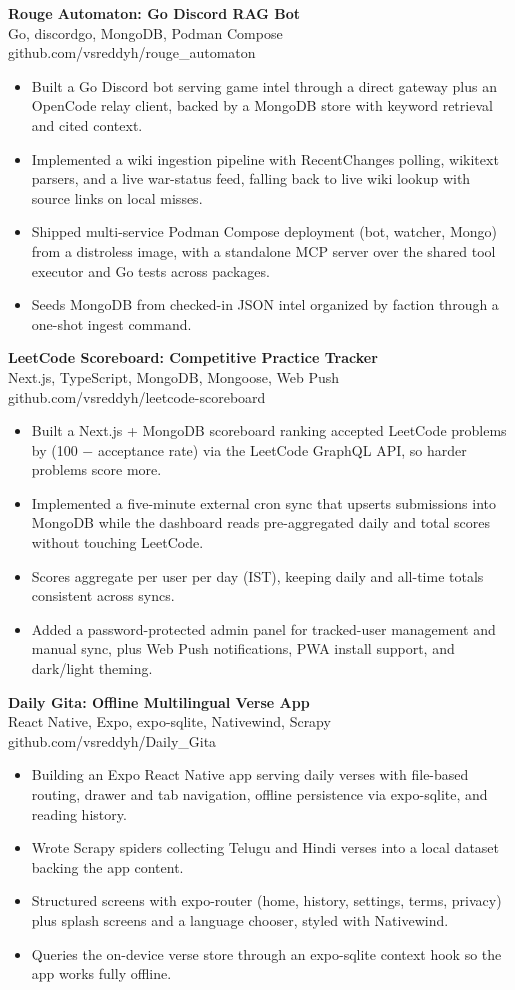 \documentclass[a4paper,11pt]{article}
\newcommand{\resumeItem}[1]{\item \small{#1}}
\newcommand{\resumeSubheading}[4]{%
  \textbf{#1} \hfill \textbf{#2} \\
{#3} \hfill {#4}
}
\newcommand{\resumeSubHeadingListStart}{\begin{itemize}}
\newcommand{\resumeSubHeadingListEnd}{\end{itemize}}
\begin{document}
\resumeSubheading
{Rouge Automaton: Go Discord RAG Bot}{}{Go, discordgo, MongoDB, Podman Compose}{github.com/vsreddyh/rouge\_automaton}
\resumeSubHeadingListStart
\resumeItem{Built a Go Discord bot serving game intel through a direct gateway plus an OpenCode relay client, backed by a MongoDB store with keyword retrieval and cited context.}
\resumeItem{Implemented a wiki ingestion pipeline with RecentChanges polling, wikitext parsers, and a live war-status feed, falling back to live wiki lookup with source links on local misses.}
\resumeItem{Shipped multi-service Podman Compose deployment (bot, watcher, Mongo) from a distroless image, with a standalone MCP server over the shared tool executor and Go tests across packages.}
\resumeItem{Seeds MongoDB from checked-in JSON intel organized by faction through a one-shot ingest command.}
\resumeSubHeadingListEnd

\resumeSubheading
{LeetCode Scoreboard: Competitive Practice Tracker}{}{Next.js, TypeScript, MongoDB, Mongoose, Web Push}{github.com/vsreddyh/leetcode-scoreboard}
\resumeSubHeadingListStart
\resumeItem{Built a Next.js + MongoDB scoreboard ranking accepted LeetCode problems by (100 $-$ acceptance rate) via the LeetCode GraphQL API, so harder problems score more.}
\resumeItem{Implemented a five-minute external cron sync that upserts submissions into MongoDB while the dashboard reads pre-aggregated daily and total scores without touching LeetCode.}
\resumeItem{Scores aggregate per user per day (IST), keeping daily and all-time totals consistent across syncs.}
\resumeItem{Added a password-protected admin panel for tracked-user management and manual sync, plus Web Push notifications, PWA install support, and dark/light theming.}
\resumeSubHeadingListEnd

\resumeSubheading
{Daily Gita: Offline Multilingual Verse App}{}{React Native, Expo, expo-sqlite, Nativewind, Scrapy}{github.com/vsreddyh/Daily\_Gita}
\resumeSubHeadingListStart
\resumeItem{Building an Expo React Native app serving daily verses with file-based routing, drawer and tab navigation, offline persistence via expo-sqlite, and reading history.}
\resumeItem{Wrote Scrapy spiders collecting Telugu and Hindi verses into a local dataset backing the app content.}
\resumeItem{Structured screens with expo-router (home, history, settings, terms, privacy) plus splash screens and a language chooser, styled with Nativewind.}
\resumeItem{Queries the on-device verse store through an expo-sqlite context hook so the app works fully offline.}
\resumeSubHeadingListEnd
\end{document}
